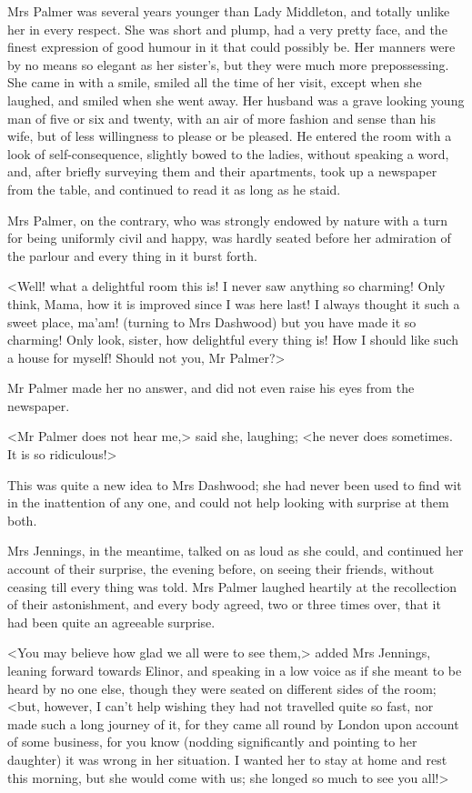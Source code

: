 Mrs Palmer was several years younger than Lady Middleton, and totally unlike her in every respect. She was short and plump, had a very pretty face, and the finest expression of good humour in it that could possibly be. Her manners were by no means so elegant as her sister's, but they were much more prepossessing. She came in with a smile, smiled all the time of her visit, except when she laughed, and smiled when she went away. Her husband was a grave looking young man of five or six and twenty, with an air of more fashion and sense than his wife, but of less willingness to please or be pleased. He entered the room with a look of self-consequence, slightly bowed to the ladies, without speaking a word, and, after briefly surveying them and their apartments, took up a newspaper from the table, and continued to read it as long as he staid.

Mrs Palmer, on the contrary, who was strongly endowed by nature with a turn for being uniformly civil and happy, was hardly seated before her admiration of the parlour and every thing in it burst forth.

<Well! what a delightful room this is! I never saw anything so charming! Only think, Mama, how it is improved since I was here last! I always thought it such a sweet place, ma'am! (turning to Mrs Dashwood) but you have made it so charming! Only look, sister, how delightful every thing is! How I should like such a house for myself! Should not you, Mr Palmer?>

Mr Palmer made her no answer, and did not even raise his eyes from the newspaper.

<Mr Palmer does not hear me,> said she, laughing; <he never does sometimes. It is so ridiculous!>

This was quite a new idea to Mrs Dashwood; she had never been used to find wit in the inattention of any one, and could not help looking with surprise at them both.

Mrs Jennings, in the meantime, talked on as loud as she could, and continued her account of their surprise, the evening before, on seeing their friends, without ceasing till every thing was told. Mrs Palmer laughed heartily at the recollection of their astonishment, and every body agreed, two or three times over, that it had been quite an agreeable surprise.

<You may believe how glad we all were to see them,> added Mrs Jennings, leaning forward towards Elinor, and speaking in a low voice as if she meant to be heard by no one else, though they were seated on different sides of the room; <but, however, I can't help wishing they had not travelled quite so fast, nor made such a long journey of it, for they came all round by London upon account of some business, for you know (nodding significantly and pointing to her daughter) it was wrong in her situation. I wanted her to stay at home and rest this morning, but she would come with us; she longed so much to see you all!>

